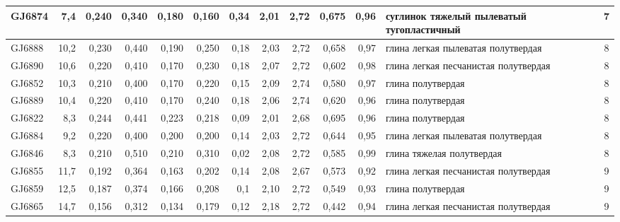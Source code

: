 \begin{sidewaystable}[p]
\begin{tabular}{@{}|l|r|r|r|r|r|r|r|r|r|r|l|c|@{}}
    GJ6874          & 7,4        & 0,240                        & 0,340   & 0,180  & 0,160  & 0,34     & 2,01     & 2,72      & 0,675   & 0,96     & суглинок тяжелый   пылеватый тугопластичный  & 7   \\ \hline
    GJ6888          & 10,2       & 0,230                        & 0,440   & 0,190  & 0,250  & 0,18     & 2,03     & 2,72      & 0,658   & 0,97     & глина легкая   пылеватая полутвердая         & 8   \\ \hline
    GJ6890          & 10,6       & 0,220                        & 0,410   & 0,170  & 0,230  & 0,18     & 2,07     & 2,72      & 0,602   & 0,98     & глина легкая   песчанистая полутвердая       & 8   \\ \hline
    GJ6852          & 10,3       & 0,210                        & 0,400   & 0,170  & 0,220  & 0,15     & 2,09     & 2,74      & 0,580   & 0,97     & глина полутвердая                            & 8   \\ \hline
    GJ6889          & 10,4       & 0,220                        & 0,410   & 0,170  & 0,240  & 0,18     & 2,06     & 2,74      & 0,620   & 0,96     & глина полутвердая                            & 8   \\ \hline
    GJ6822          & 8,3        & 0,244                        & 0,441   & 0,223  & 0,218  & 0,09     & 2,01     & 2,68      & 0,695   & 0,96     & глина полутвердая                            & 8   \\ \hline
    GJ6884          & 9,2        & 0,220                        & 0,400   & 0,200  & 0,200  & 0,14     & 2,03     & 2,72      & 0,644   & 0,95     & глина легкая   пылеватая полутвердая         & 8   \\ \hline
    GJ6846          & 8,3        & 0,210                        & 0,510   & 0,210  & 0,310  & 0,02     & 2,08     & 2,72      & 0,585   & 0,99     & глина тяжелая   полутвердая                  & 8   \\ \hline
    GJ6855          & 11,7       & 0,192                        & 0,364   & 0,163  & 0,202  & 0,14     & 2,08     & 2,67      & 0,573   & 0,92     & глина легкая   песчанистая полутвердая       & 9   \\ \hline
    GJ6859          & 12,5       & 0,187                        & 0,374   & 0,166  & 0,208  & 0,1      & 2,10     & 2,72      & 0,549   & 0,93     & глина полутвердая                            & 9   \\ \hline
    GJ6865          & 14,7       & 0,156                        & 0,312   & 0,134  & 0,179  & 0,12     & 2,18     & 2,72      & 0,442   & 0,94     & глина легкая   песчанистая полутвердая       & 9   \\ \hline

\end{tabular}
\end{sidewaystable}
